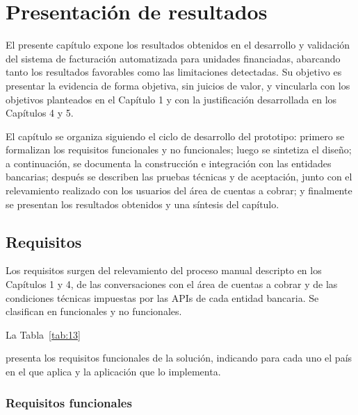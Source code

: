 \chapter{Presentación de resultados}\label{cap:resultados}

El presente capítulo expone los resultados obtenidos en el desarrollo y validación del sistema de facturación automatizada para unidades financiadas, abarcando tanto los resultados favorables como las limitaciones detectadas. Su objetivo es presentar la evidencia de forma objetiva, sin juicios de valor, y vincularla con los objetivos planteados en el Capítulo 1 y con la justificación desarrollada en los Capítulos 4 y 5.

El capítulo se organiza siguiendo el ciclo de desarrollo del prototipo: primero se formalizan los requisitos funcionales y no funcionales; luego se sintetiza el diseño; a continuación, se documenta la construcción e integración con las entidades bancarias; después se describen las pruebas técnicas y de aceptación, junto con el relevamiento realizado con los usuarios del área de cuentas a cobrar; y finalmente se presentan los resultados obtenidos y una síntesis del capítulo.

\section{Requisitos}

Los requisitos surgen del relevamiento del proceso manual descripto en los Capítulos 1 y 4, de las conversaciones con el área de cuentas a cobrar y de las condiciones técnicas impuestas por las APIs de cada entidad bancaria. Se clasifican en funcionales y no funcionales.

La Tabla~\ref{tab:13}

presenta los requisitos funcionales de la solución, indicando para cada uno el país en el que aplica y la aplicación que lo implementa.

\subsection{Requisitos funcionales}

